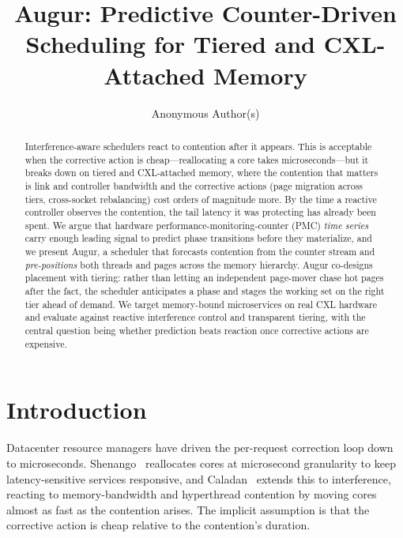 \documentclass[sigconf,nonacm]{acmart}
\begin{document}
\title{Augur: Predictive Counter-Driven Scheduling for Tiered and
CXL-Attached Memory}

\author{Anonymous Author(s)}

\begin{abstract}
Interference-aware schedulers react to contention after it appears. This is
acceptable when the corrective action is cheap---reallocating a core takes
microseconds---but it breaks down on tiered and CXL-attached memory, where the
contention that matters is link and controller bandwidth and the corrective
actions (page migration across tiers, cross-socket rebalancing) cost orders of
magnitude more. By the time a reactive controller observes the contention, the
tail latency it was protecting has already been spent. We argue that hardware
performance-monitoring-counter (PMC) \emph{time series} carry enough leading
signal to predict phase transitions before they materialize, and we present
Augur, a scheduler that forecasts contention from the counter stream and
\emph{pre-positions} both threads and pages across the memory hierarchy. Augur
co-designs placement with tiering: rather than letting an independent page-mover
chase hot pages after the fact, the scheduler anticipates a phase and stages the
working set on the right tier ahead of demand. We target memory-bound
microservices on real CXL hardware and evaluate against reactive interference
control and transparent tiering, with the central question being whether
prediction beats reaction once corrective actions are expensive.
\end{abstract}

\maketitle

\section{Introduction}
Datacenter resource managers have driven the per-request correction loop down to
microseconds. Shenango~\cite{ousterhout2019shenango} reallocates cores at
microsecond granularity to keep latency-sensitive services responsive, and
Caladan~\cite{fried2020caladan} extends this to interference, reacting to
memory-bandwidth and hyperthread contention by moving cores almost as fast as the
contention arises. The implicit assumption is that the corrective action is cheap
relative to the contention's duration.
\end{document}
